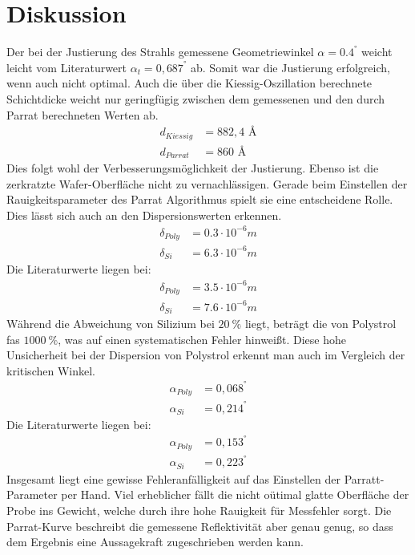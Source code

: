\section{Diskussion}
\label{sec:Diskussion}

Der bei der Justierung des Strahls gemessene Geometriewinkel $\alpha = 0.4^°$ weicht leicht vom Literaturwert $\alpha_{t} = 0,687^°$ ab.
Somit war die Justierung erfolgreich, wenn auch nicht optimal.
Auch die über die Kiessig-Oszillation berechnete Schichtdicke weicht nur geringfügig zwischen dem gemessenen 
und den durch Parrat berechneten Werten ab.
\begin{align*}
    d_{Kiessig} &= 882,4 \text{ \AA} \\
    d_{Parrat} &= 860 \text{ \AA}
\end{align*}
Dies folgt wohl der Verbesserungsmöglichkeit der Justierung.
Ebenso ist die zerkratzte Wafer-Oberfläche nicht zu vernachlässigen.
Gerade beim Einstellen der Rauigkeitsparameter des Parrat Algorithmus spielt sie eine entscheidene Rolle.
Dies lässt sich auch an den Dispersionswerten erkennen.
\begin{align*}
    \delta_{Poly} &= 0.3 \cdot 10^{-6} m\\
    \delta_{Si} &= 6.3 \cdot 10^{-6} m 
\end{align*}
Die Literaturwerte \cite{wert} liegen bei:
\begin{align*}
    \delta_{Poly} &= 3.5 \cdot 10^{-6} m\\
    \delta_{Si} &= 7.6 \cdot 10^{-6} m
\end{align*}
Während die Abweichung von Silizium bei $\qty{20}{\percent}$ liegt, beträgt die von Polystrol fas $\qty{1000}{\percent}$,
was auf einen systematischen Fehler hinweißt.
Diese hohe Unsicherheit bei der Dispersion von Polystrol erkennt man auch im Vergleich der kritischen Winkel.
\begin{align*}
    \alpha_{Poly} &= 0,068^°  \\
    \alpha_{Si} &= 0,214^°
\end{align*}
Die Literaturwerte \cite{wert} liegen bei:
\begin{align*}
    \alpha_{Poly} &= 0,153^°  \\
    \alpha_{Si} &= 0,223^°
\end{align*}
Insgesamt liegt eine gewisse Fehleranfälligkeit auf das Einstellen der Parratt-Parameter per Hand.
Viel erheblicher fällt die nicht oütimal glatte Oberfläche der Probe ins Gewicht,
welche durch ihre hohe Rauigkeit für Messfehler sorgt. 
Die Parrat-Kurve beschreibt die gemessene Reflektivität aber genau genug, 
so dass dem Ergebnis eine Aussagekraft zugeschrieben werden kann.